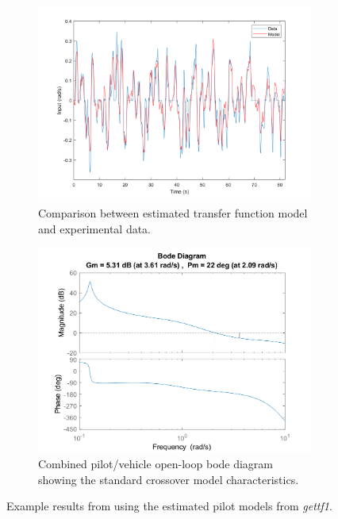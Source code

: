 \begin{figure}[h]
    \centering
    \begin{subfigure}[b]{0.49\textwidth}
        \centering
        \includegraphics[width=\textwidth]{figures/model_output.png}
        \caption{Comparison between estimated transfer function model and experimental data.}
        \label{fig:comparison}
    \end{subfigure}
    \hfill
    \begin{subfigure}[b]{0.49\textwidth}
        \centering
        \includegraphics[width=\textwidth]{figures/YpYc_204.png}
        \caption{Combined pilot/vehicle open-loop bode diagram showing the standard crossover model characteristics.}
        \label{fig:bode}
    \end{subfigure}
       \caption{Example results from using the estimated pilot models from \textit{gettf1}.}
\end{figure}

